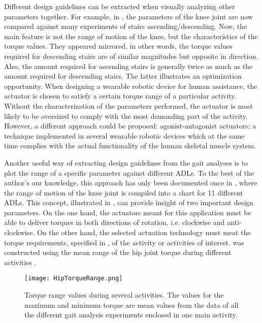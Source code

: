 Different design guidelines can be extracted when visually analyzing other parameters together. For example, in  , the parameters of the knee joint are now compared against many experiments of stairs ascending/descending. Now, the main feature is not the range of motion of the knee, but the characteristics of the torque values. They appeared mirrored, in other words, the torque values required for descending stairs are of similar magnitudes but opposite in direction. Also, the amount required for ascending stairs is generally twice as much as the amount required for descending stairs. The latter illustrates an optimization opportunity. When designing a wearable robotic device for human assistance, the actuator is chosen to satisfy a certain torque range of a particular activity. Without the characterization of the parameters performed, the actuator is most likely to be oversized to comply with the most demanding part of the activity. However, a different approach could be proposed: agonist-antagonist actuators; a technique implemented in several wearable robotic devices which at the same time complies with the actual functionality of the human skeletal muscle system.

Another useful way of extracting design guidelines from the gait analyses is to plot the range of a specific parameter against different ADLs. To the best of the author's our knowledge, this approach has only been documented once in \cite{rowe2000knee}, where the range of motion of the knee joint is compiled into a chart for 11 different ADLs. This concept, illustrated in , can provide insight of two important design parameters. On the one hand, the actuators meant for this application must be able to deliver torques in both directions of rotation, i.e. clockwise and anti-clockwise. On the other hand, the selected actuation technology must meat the torque requirements, specified in , of the activity or activities of interest.  was constructed using the mean range of the hip joint torque during different activities \cite{bovi2011multiple,lee2008biomechanics,han2011biomechanical,protopapadaki2007hip,riener2002stair,mcintosh2006gait,roebroeck1994biomechanics,mak2003joint}.

\begin{figure}[htbp!]
    \centering
    \texttt{[image: HipTorqueRange.png]}
    \caption{Torque range values during several activities. The values for the maximum and minimum torque are mean values from the data of all the different gait analysis experiments enclosed in one main activity. \cite{bovi2011multiple,lee2008biomechanics,han2011biomechanical,protopapadaki2007hip,riener2002stair,mcintosh2006gait,roebroeck1994biomechanics,mak2003joint,solis2017characterization} }
    \label{fig:HipTorqueRange}
\end{figure}

